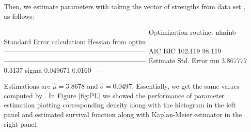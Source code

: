 \documentclass[nojss]{jss}
\begin{document}
Then, we estimate parameters with  taking the vector of strengths from data set , as follows:

\begin{Schunk}
\begin{Soutput}
---------------------------------------------------------------
Optimization routine: nlminb 
Standard Error calculation: Hessian from optim 
---------------------------------------------------------------
      AIC    BIC
  102.119 98.119
---------------------------------------------------------------
      Estimate  Std. Error
mu     3.867777     0.3137
sigma  0.049671     0.0160
-----
\end{Soutput}
\end{Schunk}

Estimations are $\hat{\mu}=3.8678$ and $\hat{\sigma}=0.0497$. Essentially, we get the same values computed by \cite{Ghitany2013}. In Figure \ref{fig:PL} we showed the performance of parameter estimation plotting corresponding density along with the histogram in the left panel and estimated survival function along with Kaplan-Meier estimator in the right panel.
\end{document}
